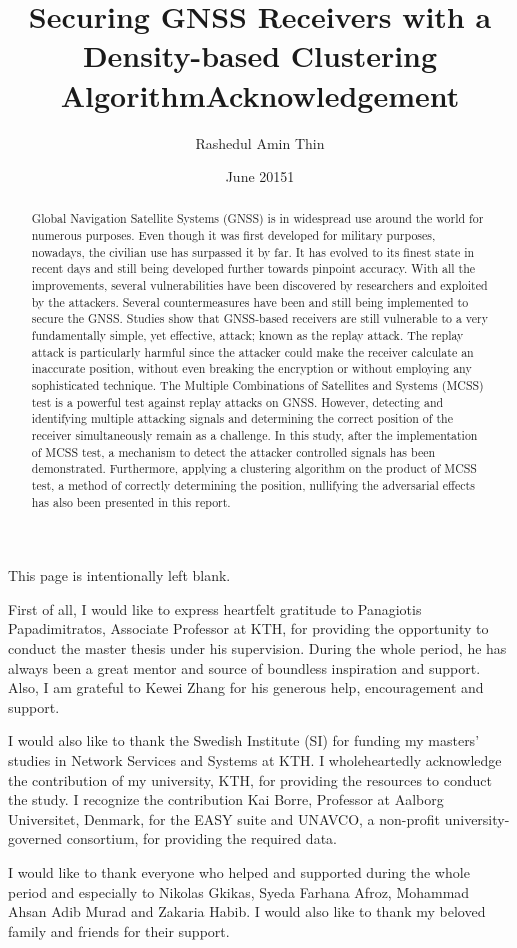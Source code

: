 \documentclass[12pt,twoside,a4paper]{report}
\title{\textbf{Securing GNSS Receivers with a Density-based Clustering Algorithm}}
\date{June 20151}
\author{Rashedul Amin Thin}
\begin{document}
 
\newpage
 \maketitle
This page is intentionally left blank.

\newpage
\begin{abstract}
Global Navigation Satellite Systems (GNSS) is in widespread use around the world for numerous purposes. Even though it was first developed for military purposes, nowadays, the civilian use has surpassed it by far. It has evolved to its finest state in recent days and still being developed further towards pinpoint accuracy. With all the improvements, several vulnerabilities have been discovered by researchers and exploited by the attackers. Several countermeasures have been and still being implemented to secure the GNSS. Studies show that GNSS-based receivers are still vulnerable to a very fundamentally simple, yet effective, attack; known as the replay attack. The replay attack is particularly harmful since the attacker could make the receiver calculate an inaccurate position, without even breaking the encryption or without employing any sophisticated technique. The Multiple Combinations of Satellites and Systems (MCSS) test is a powerful test against replay attacks on GNSS. However, detecting and identifying multiple attacking signals and determining the correct position of the receiver simultaneously remain as a challenge. In this study, after the implementation of MCSS test, a mechanism to detect the attacker controlled signals has been demonstrated. Furthermore, applying a clustering algorithm on the product of MCSS test, a method of correctly determining the position, nullifying the adversarial effects has also been presented in this report.
\end{abstract}
\newpage
\begin{chapter}
\title{Acknowledgement}
\maketitle
First of all, I would like to express heartfelt gratitude to Panagiotis Papadimitratos, Associate Professor at KTH, for providing the opportunity to conduct the master thesis under his supervision. During the whole period, he has always been a great mentor and source of boundless inspiration and support. Also, I am grateful to Kewei Zhang for his
generous help, encouragement and support.

I would also like to thank the Swedish Institute (SI) for funding my masters’ studies in Network Services and Systems at KTH. 
I wholeheartedly acknowledge the contribution of my university, KTH, for providing the resources to conduct the study. I recognize the contribution Kai Borre, Professor at Aalborg Universitet, Denmark, for the EASY suite and UNAVCO, a non-profit university-governed consortium, for providing the required data.

I would like to thank everyone who helped and supported during the whole period and especially to Nikolas Gkikas, Syeda Farhana Afroz, Mohammad Ahsan Adib Murad and Zakaria Habib. I would also like to thank my beloved family and friends for their support.
\end{chapter}
\end{document}
